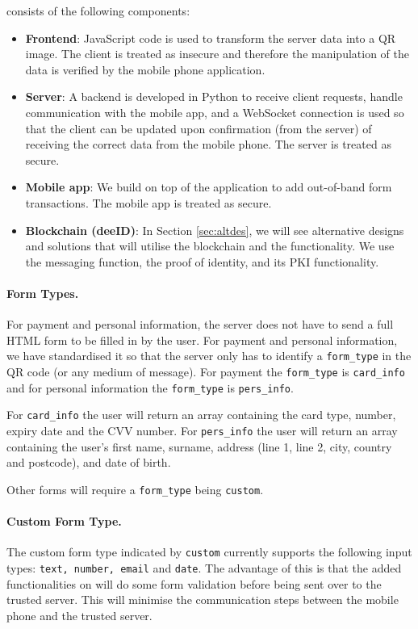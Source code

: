 \formless consists of the following components:
\begin{itemize}
    \item \textbf{Frontend}: JavaScript code is used to transform the server data into a QR image. The client is treated as insecure and therefore the manipulation of the data is verified by the mobile phone application.
    \item \textbf{Server}: A backend is developed in Python to receive client requests, handle communication with the mobile app, and a WebSocket connection is used so that the client can be updated upon confirmation (from the server) of receiving the correct data from the mobile phone. The server is treated as secure.
    \item \textbf{Mobile app}: We build on top of the \deeid application to add out-of-band form transactions. The mobile app is treated as secure.
    \item \textbf{Blockchain (deeID)}: In Section \ref{sec:altdes}, we will see alternative designs and solutions that will utilise the blockchain and the \deeid functionality. We use the messaging function, the proof of identity, and its PKI functionality.
\end{itemize}

\paragraph{Form Types.}
For payment and personal information, the server does not have to send a full HTML form to be filled in by the user. For payment and personal information, we have standardised it so that the server only has to identify a \texttt{form\_type} in the QR code (or any medium of message). For payment the \texttt{form\_type} is \texttt{card\_info} and for personal information the \texttt{form\_type} is \texttt{pers\_info}.

For \texttt{card\_info} the user will return an array containing the card type, number, expiry date and the CVV number. For \texttt{pers\_info} the user will return an array containing the user's first name, surname, address (line 1, line 2, city, country and postcode), and date of birth.

Other forms will require a \texttt{form\_type} being \texttt{custom}.

\paragraph{Custom Form Type.}
The custom form type indicated by \texttt{custom} currently supports the following input types: \texttt{text, number, email} and \texttt{date}. The advantage of this is that the added functionalities on \deeid will do some form validation before being sent over to the trusted server. This will minimise the communication steps between the mobile phone and the trusted server.

